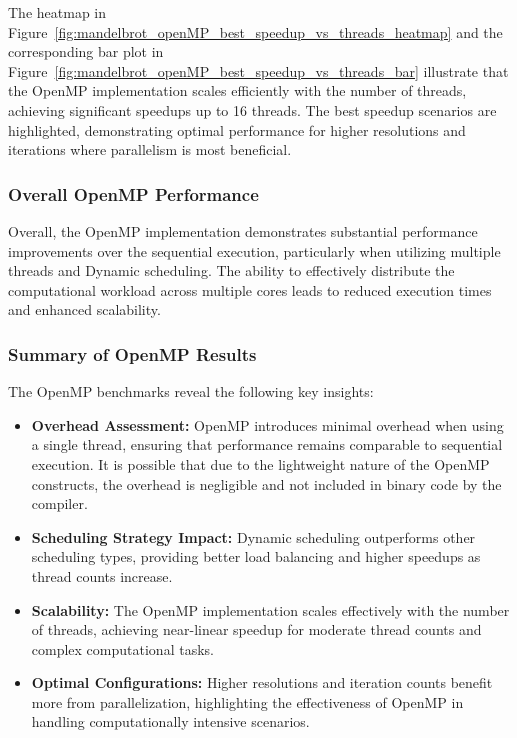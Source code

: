 \documentclass[
	report, %
	11pt, %
]{CSUniSchoolLabReport}
\newcounter{ct}
\begin{document}
The heatmap in Figure~\ref{fig:mandelbrot_openMP_best_speedup_vs_threads_heatmap} and the corresponding bar plot in Figure~\ref{fig:mandelbrot_openMP_best_speedup_vs_threads_bar} illustrate that the OpenMP implementation scales efficiently with the number of threads, achieving significant speedups up to 16 threads. The best speedup scenarios are highlighted, demonstrating optimal performance for higher resolutions and iterations where parallelism is most beneficial.

\subsubsection{Overall OpenMP Performance}

Overall, the OpenMP implementation demonstrates substantial performance improvements over the sequential execution, particularly when utilizing multiple threads and Dynamic scheduling. The ability to effectively distribute the computational workload across multiple cores leads to reduced execution times and enhanced scalability.

\subsubsection{Summary of OpenMP Results}

The OpenMP benchmarks reveal the following key insights:

\begin{itemize}
	\item \textbf{Overhead Assessment:} OpenMP introduces minimal overhead when using a single thread, ensuring that performance remains comparable to sequential execution. It is possible that due to the lightweight nature of the OpenMP constructs, the overhead is negligible and not included in binary code by the compiler.
	\item \textbf{Scheduling Strategy Impact:} Dynamic scheduling outperforms other scheduling types, providing better load balancing and higher speedups as thread counts increase.
	\item \textbf{Scalability:} The OpenMP implementation scales effectively with the number of threads, achieving near-linear speedup for moderate thread counts and complex computational tasks.
	\item \textbf{Optimal Configurations:} Higher resolutions and iteration counts benefit more from parallelization, highlighting the effectiveness of OpenMP in handling computationally intensive scenarios.
\end{itemize}
\end{document}
